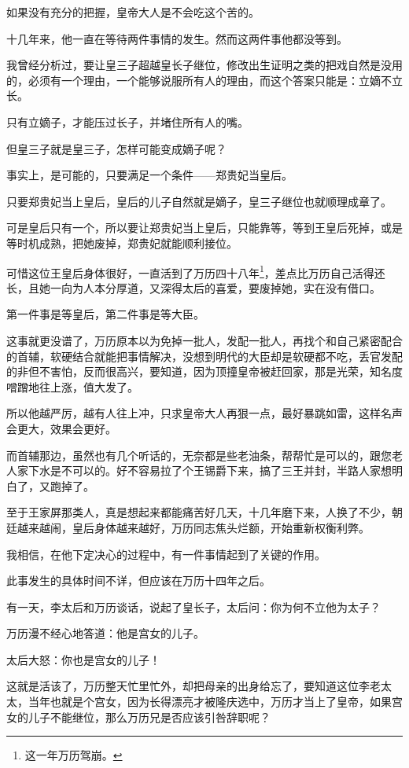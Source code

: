 \begin{multicols}{\theparacolNo}
如果没有充分的把握，皇帝大人是不会吃这个苦的。

十几年来，他一直在等待两件事情的发生。然而这两件事他都没等到。

我曾经分析过，要让皇三子超越皇长子继位，修改出生证明之类的把戏自然是没用的，必须有一个理由，一个能够说服所有人的理由，而这个答案只能是：立嫡不立长。

只有立嫡子，才能压过长子，并堵住所有人的嘴。

但皇三子就是皇三子，怎样可能变成嫡子呢？

事实上，是可能的，只要满足一个条件——郑贵妃当皇后。

只要郑贵妃当上皇后，皇后的儿子自然就是嫡子，皇三子继位也就顺理成章了。

可是皇后只有一个，所以要让郑贵妃当上皇后，只能靠等，等到王皇后死掉，或是等时机成熟，把她废掉，郑贵妃就能顺利接位。

可惜这位王皇后身体很好，一直活到了万历四十八年\footnote{这一年万历驾崩。}，差点比万历自己活得还长，且她一向为人本分厚道，又深得太后的喜爱，要废掉她，实在没有借口。

第一件事是等皇后，第二件事是等大臣。

这事就更没谱了，万历原本以为免掉一批人，发配一批人，再找个和自己紧密配合的首辅，软硬结合就能把事情解决，没想到明代的大臣却是软硬都不吃，丢官发配的非但不害怕，反而很高兴，要知道，因为顶撞皇帝被赶回家，那是光荣，知名度噌蹭地往上涨，值大发了。

所以他越严厉，越有人往上冲，只求皇帝大人再狠一点，最好暴跳如雷，这样名声会更大，效果会更好。

而首辅那边，虽然也有几个听话的，无奈都是些老油条，帮帮忙是可以的，跟您老人家下水是不可以的。好不容易拉了个王锡爵下来，搞了三王并封，半路人家想明白了，又跑掉了。

至于王家屏那类人，真是想起来都能痛苦好几天，十几年磨下来，人换了不少，朝廷越来越闹，皇后身体越来越好，万历同志焦头烂额，开始重新权衡利弊。

我相信，在他下定决心的过程中，有一件事情起到了关键的作用。

此事发生的具体时间不详，但应该在万历十四年之后。

有一天，李太后和万历谈话，说起了皇长子，太后问：你为何不立他为太子？

万历漫不经心地答道：他是宫女的儿子。

太后大怒：你也是宫女的儿子！

这就是活该了，万历整天忙里忙外，却把母亲的出身给忘了，要知道这位李老太太，当年也就是个宫女，因为长得漂亮才被隆庆选中，万历才当上了皇帝，如果宫女的儿子不能继位，那么万历兄是否应该引咎辞职呢？


\end{multicols}
